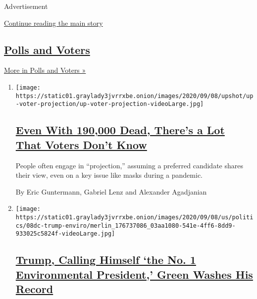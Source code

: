 Advertisement

\protect\hyperlink{after-mid1}{Continue reading the main story}

\hypertarget{polls-and-voters}{%
\subsection{\texorpdfstring{\href{/news-event/presidential-election-polls}{Polls
and Voters}}{Polls and Voters}}\label{polls-and-voters}}

\href{/news-event/presidential-election-polls}{More in Polls and Voters
»}

\begin{enumerate}
\def\labelenumi{\arabic{enumi}.}
\item
  \texttt{[image: https://static01.graylady3jvrrxbe.onion/images/2020/09/08/upshot/up-voter-projection/up-voter-projection-videoLarge.jpg]}

  \hypertarget{even-with-190000-dead-theres-a-lot-that-voters-dont-know}{%
  \subsection{\texorpdfstring{\href{/2020/09/10/upshot/voters-trump-virus-projection.html}{Even
  With 190,000 Dead, There's a Lot That Voters Don't
  Know}}{Even With 190,000 Dead, There's a Lot That Voters Don't Know}}\label{even-with-190000-dead-theres-a-lot-that-voters-dont-know}}

  People often engage in ``projection,'' assuming a preferred candidate
  shares their view, even on a key issue like masks during a pandemic.

  By Eric Guntermann, Gabriel Lenz and Alexander Agadjanian
\item
  \texttt{[image: https://static01.graylady3jvrrxbe.onion/images/2020/09/08/us/politics/08dc-trump-enviro/merlin\_176737086\_03aa1080-541e-4ff6-8dd9-933025c5824f-videoLarge.jpg]}

  \hypertarget{trump-calling-himself-the-no-1-environmental-president-green-washes-his-record}{%
  \subsection{\texorpdfstring{\href{/2020/09/08/us/politics/trump-drilling-environment-florida.html}{Trump,
  Calling Himself `the No. 1 Environmental President,' Green Washes His
  Record}}{Trump, Calling Himself `the No. 1 Environmental President,' Green Washes His Record}}\label{trump-calling-himself-the-no-1-environmental-president-green-washes-his-record}}


\end{enumerate}
